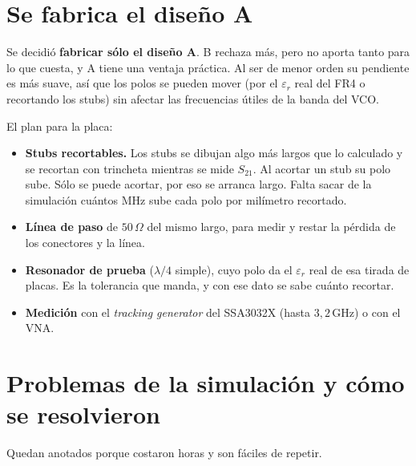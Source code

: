 \section{Se fabrica el diseño A}
\label{sec:frf_decision}

Se decidió \textbf{fabricar sólo el diseño A}. B rechaza más, pero no aporta
tanto para lo que cuesta, y A tiene una ventaja práctica. Al ser de menor
orden su pendiente es más suave, así que los polos se pueden mover (por el
$\varepsilon_r$ real del FR4 o recortando los stubs) sin afectar las
frecuencias útiles de la banda del VCO.

El plan para la placa:
\begin{itemize}
  \item \textbf{Stubs recortables.} Los stubs se dibujan algo más largos que
    lo calculado y se recortan con trincheta mientras se mide $S_{21}$. Al
    acortar un stub su polo sube. Sólo se puede acortar, por eso se arranca
    largo. Falta sacar de la simulación cuántos MHz sube cada polo por
    milímetro recortado.
  \item \textbf{Línea de paso} de $50\,\Omega$ del mismo largo, para medir y
    restar la pérdida de los conectores y la línea.
  \item \textbf{Resonador de prueba} ($\lambda/4$ simple), cuyo polo da el
    $\varepsilon_r$ real de esa tirada de placas. Es la tolerancia que manda,
    y con ese dato se sabe cuánto recortar.
  \item \textbf{Medición} con el \emph{tracking generator} del SSA3032X
    (hasta $3{,}2\,\text{GHz}$) o con el VNA.
\end{itemize}

\section{Problemas de la simulación y cómo se resolvieron}
\label{sec:frf_problemas}

Quedan anotados porque costaron horas y son fáciles de repetir.

